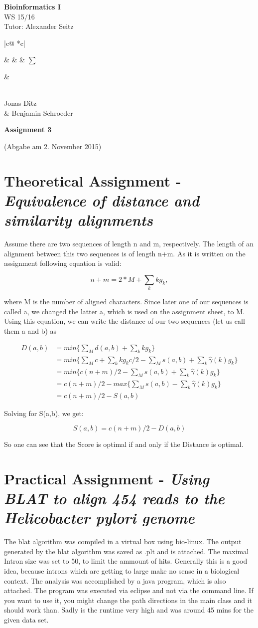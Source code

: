 \documentclass[%
   10pt,              %
   nenglish,           %
   a4paper,           %
   DIV11,             %
]{scrartcl}%
\makeatletter
\def\header#1#2#3#4#5#6#7{\pagestyle{empty}
\noindent
\begin{minipage}[t]{0.6\textwidth}
\begin{flushleft}
\textbf{#4}\\%
#6\\%
Tutor: #2  %
\end{flushleft}
\end{minipage}
\begin{minipage}[t]{0.4\textwidth}
\begin{flushright}
\points{#7}%
\vspace*{0.2cm}
#5%
\end{flushright}
\end{minipage}

\begin{center}
{\Large\textbf{ Assignment #1}} %

{(Abgabe am #3)} %
\end{center}
}
\newenvironment{vartab}[1]
{
    \begin{tabular}{ |c@{} *{#1}{c|} } %
}{
    \end{tabular}
}
\newcommand{\myformat}[1]{& #1}
\newcommand{\numbers}[1]{
  \newcounter{ctra}
\setcounter{ctra}{1}
\whiledo {\value{ctra} < #1}%
{%
  \myformat{\thectra}
  \stepcounter{ctra}%
}
\myformat{\thectra}
}
\newcommand{\emptyLine}[1]{
  \newcounter{ctra1}
\setcounter{ctra}{1}
\whiledo {\value{ctra1} < #1}%
{%
  \myformat{\hspace*{0.5cm}}
  \stepcounter{ctra1}%
}
}
\newcommand{\points}[1]{
\newcounter{colmns}
\setcounter{colmns}{#1}
\stepcounter{colmns}
  \begin{vartab}{\thecolmns}
    \numbers{#1} & $\sum$\\\hline
    \emptyLine{\thecolmns}\\
  \end{vartab}
}
\makeatother
\begin{document}
\header{3}{Alexander Seitz}{2. November 2015}{Bioinformatics I}{\\Jonas Ditz \\\& Benjamin Schroeder}{WS 15/16}{3}

\section*{Theoretical Assignment - \textsl{Equivalence of distance and similarity alignments}}
Assume there are two sequences of length n and m, respectively. The length of an alignment between
this two sequences is of length n+m. As it is written on the assignment following equation is 
valid:

\begin{equation}
 n + m = 2*M + \sum_k kg_k ,
\end{equation}

where M is the number of aligned characters. Since later one of our sequences is called a, we 
changed the latter a, which is used on the assignment sheet, to M. \\
Using this equation, we can write the distance of our two sequences (let us call them a and b) as

\begin{align}
 D(a,b) &= min\{\sum_M d(a,b) + \sum_k k g_k\} \nonumber\\
        &= min\{\sum_M c + \sum_k k g_k c/2 - \sum_M s(a,b) + \sum_k \hat{\gamma}(k) g_k\} \nonumber\\
        &= min\{c(n+m)/2 - \sum_M s(a,b) + \sum_k \hat{\gamma}(k) g_k\} \nonumber\\
        &= c(n+m)/2 - max\{\sum_M s(a,b) - \sum_k \hat{\gamma}(k) g_k\} \nonumber\\
        &= c(n+m)/2 - S(a,b)
\end{align}

Solving for S(a,b), we get:

\begin{equation}
 S(a,b) = c(n+m)/2 - D(a,b)
\end{equation}

So one can see that the Score is optimal if and only if the Distance is optimal.

\section*{Practical Assignment - \textsl{Using BLAT to align 454 reads to the Helicobacter pylori genome}}
The blat algorithm was compiled in a virtual box using bio-linux. The output generated by the blat algorithm was saved as .plt and is attached. The maximal Intron size was set to 50, to limit the ammount of hits. Generally this is a good idea, because introns which are getting to large make no sense in a biological context. The analysis was accomplished by a java program, which is also attached. The program was executed via eclipse and not via the command line. If you want to use it, you might change the path directions in the main class and it should work than. Sadly is the runtime very high and was around 45 mins for the given data set. \\
\end{document}
